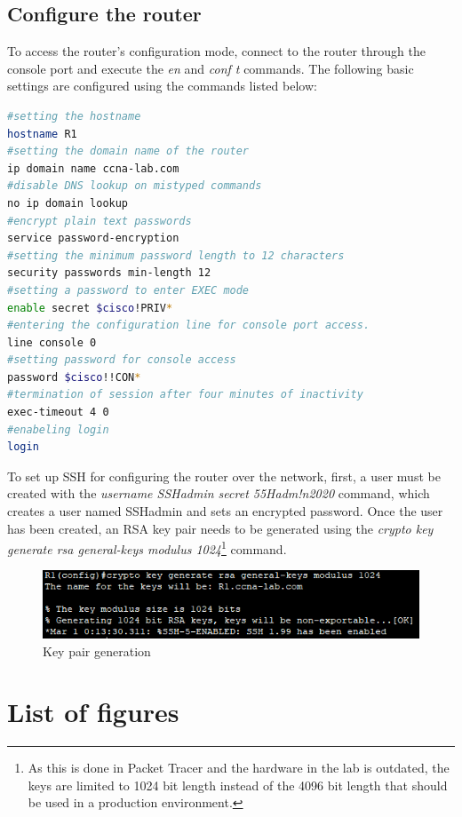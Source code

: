 \documentclass[a4paper]{article}
\newcommand{\abc}{\hfill \break}
\newcommand{\ii}{\textit}
\begin{document}
\subsection{Configure the router}
To access the router's configuration mode, connect to the router through the console port and execute the \ii{en} and \ii{conf t} commands.\abc
The following basic settings are configured using the commands listed below:
\begin{lstlisting}[language=bash,
	keywordstyle=\color{black},
	rulecolor=\color{blue}]
#setting the hostname
hostname R1
#setting the domain name of the router
ip domain name ccna-lab.com
#disable DNS lookup on mistyped commands
no ip domain lookup
#encrypt plain text passwords
service password-encryption
#setting the minimum password length to 12 characters
security passwords min-length 12
#setting a password to enter EXEC mode
enable secret $cisco!PRIV*
#entering the configuration line for console port access.
line console 0
#setting password for console access
password $cisco!!CON*
#termination of session after four minutes of inactivity
exec-timeout 4 0
#enabeling login 
login
\end{lstlisting}
To set up SSH for configuring the router over the network, first, a user must be created with the \ii{username SSHadmin secret 55Hadm!n2020} command, which creates a user named SSHadmin and sets an encrypted password.\abc
Once the user has been created, an RSA key pair needs to be generated using the \ii{crypto key generate rsa general-keys modulus 1024}\footnote{As this is done in Packet Tracer and the hardware in the lab is outdated, the keys are limited to 1024 bit length instead of the 4096 bit length that should be used in a production environment.} command.

\begin{figure}[h]
	\includegraphics[scale=0.55]{images/keygen.png}
	\centering
	\caption{Key pair generation}
\end{figure}\abc





\newpage
\section{List of figures}

\listoffigures
\end{document}

